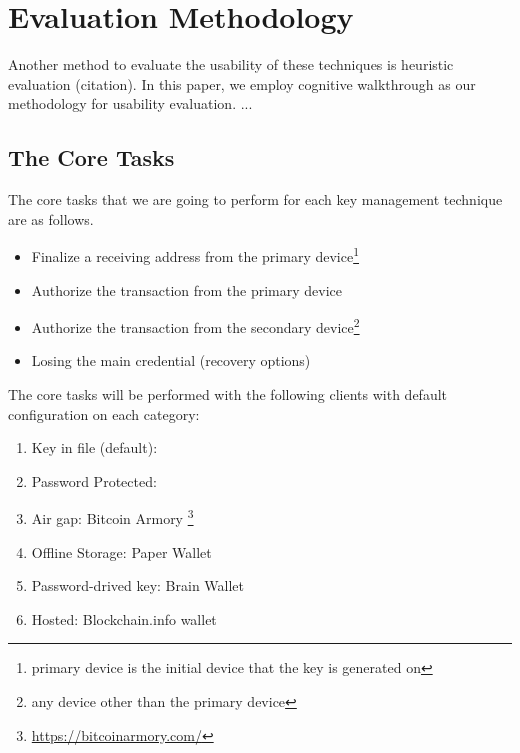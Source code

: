 
\section{Evaluation Methodology}

Another method to evaluate the usability of these techniques is heuristic evaluation (citation). In this paper, we employ cognitive walkthrough as our methodology for usability evaluation.
... 


\subsection {The Core Tasks}
The core tasks that we are going to perform for each key management technique are as follows.

\begin{itemize}
\renewcommand{\labelitemi}{\bf CT-1}
\item Finalize a receiving address from the primary device\footnote{primary device is the initial device that the key is generated on} 
\renewcommand{\labelitemi}{\bf CT-2}
\item Authorize the transaction from the primary device 
\renewcommand{\labelitemi}{\bf CT-3}
\item Authorize the transaction from the secondary device\footnote{any device other than the primary device}
\renewcommand{\labelitemi}{\bf CT-4}
\item Losing the main credential (recovery options)
\end{itemize}

The core tasks will be performed with the following clients with default configuration on each category:

\begin{enumerate}
\item Key in file (default):  \bitcoinclient 
\item Password Protected: \multibit 
\item Air gap: Bitcoin Armory \footnote{\url{https://bitcoinarmory.com/}}
\item Offline Storage: Paper Wallet
\item Password-drived key: Brain Wallet
\item Hosted: Blockchain.info wallet

\end{enumerate}


